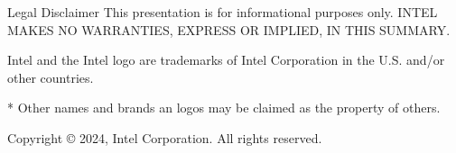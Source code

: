 
\begin{frame}[c]{Legal Disclaimer}
  This presentation is for informational purposes only.
  INTEL MAKES NO WARRANTIES, EXPRESS OR IMPLIED, IN THIS SUMMARY.

  \vspace{\baselineskip}
  Intel and the Intel logo are trademarks of Intel Corporation in the
  U.S. and/or other countries.

  \vspace{\baselineskip}
  * Other names and brands an logos may be claimed as the property of others.

  \vspace{\baselineskip}
  Copyright © 2024, Intel Corporation. All rights reserved.
\end{frame}
